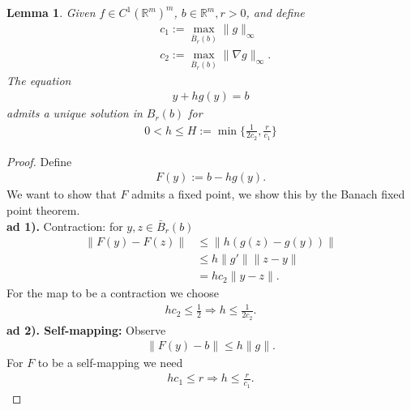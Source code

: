 \documentclass[a4paper,12pt,oneside,fleqn]{book}
\newtheorem{lemma}[theorem]{Lemma}
\theoremstyle{definition}
\theoremstyle{remark}
\begin{document}
\begin{lemma}
	Given $f \in C^1(\mathbb{R}^m)^m$, $b \in \mathbb{R}^m, r >0$, and define
	\begin{align*}
		& c_1:= \max_{\overline{B}_r(b)} \|g\|_\infty \\
		& c_2:= \max_{\overline{B}_r(b)} \|\nabla g\|_\infty.
	\end{align*}
	The equation
	\begin{align*}
		y + hg(y) = b
	\end{align*}
	admits a unique solution in $B_r(b)$ for 
	\begin{align*}
		0 < h \le H:= \min\{\frac{1}{2c_2}, \frac{r}{c_1}\}
	\end{align*}
\end{lemma}
\begin{proof}
	Define
	\begin{align*}
		F(y):= b - hg(y).
	\end{align*}
	We want to show that $F$ admits a fixed point, we show this by the Banach fixed point theorem. \\
	\textbf{ad 1).} Contraction: for $y, z \in \bar{B}_r(b)$
	\begin{align*}
		\|F(y) - F(z)\| &\le \|h (g(z) - g(y))\|\\
		& \le h \|g'\|\|z - y\|\\
		& = h c_2\|y -z\|. 
	\end{align*}
	For the map to be a contraction we choose
	\begin{align*}
		h c_2 \le  \frac{1}{2} \Rightarrow h \le  \frac{1}{2c_2}.
	\end{align*}
	\textbf{ad 2). Self-mapping:} Observe
	\begin{align*}
		\|F(y) - b\| \le h \|g\|.
	\end{align*}
	For $F$ to be a self-mapping we need
	\begin{align*}
		h c_1 \le r \Rightarrow h \le \frac{r}{c_1}.
	\end{align*}

\end{proof}
\end{document}

